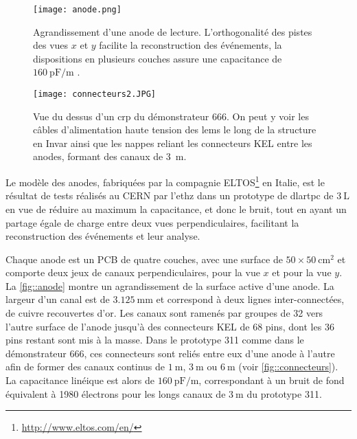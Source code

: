             \begin{figure}[htbp]
                \begin{center}\texttt{[image: anode.png]}\end{center}
                \caption[Agrandissement d'une anode de lecture.]{Agrandissement d'une anode de lecture. L'orthogonalité des pistes des vues $x$ et $y$ facilite la reconstruction des événements, la dispositions en plusieurs couches assure une capacitance de $\SI{160}{\pico\farad\per\meter}$ \cite{Cantini2013}.}
                \label{fig::anode}
            \end{figure}
            \begin{figure}[htbp]
                \begin{center}\texttt{[image: connecteurs2.JPG]}\end{center}
                \caption[Vue du dessus d'un \gls{crp} du démonstrateur 666.]{Vue du dessus d'un \gls{crp} du démonstrateur 666. On peut y voir les câbles d'alimentation haute tension des \glspl{lem} le long de la structure en Invar ainsi que les nappes reliant les connecteurs KEL entre les anodes, formant des canaux de \SI{3}{\meter}.}
                \label{fig::connecteurs}
            \end{figure}
            
            Le modèle des anodes, fabriquées par la compagnie ELTOS\footnote{\url{http://www.eltos.com/en/}} en Italie, est le résultat de tests réalisés au CERN par l'\gls{ethz} dans un prototype de \gls{dlartpc} de $\SI{3}{\liter}$ \cite{Cantini2013} en vue de réduire au maximum la capacitance, et donc le bruit, tout en ayant un partage égale de charge entre deux vues perpendiculaires, facilitant la reconstruction des événements et leur analyse.
            
            Chaque anode est un PCB de quatre couches, avec une surface de  $50\times\SI{50}{\centi\meter\squared}$ et comporte deux jeux de canaux perpendiculaires,  pour la vue $x$ et  pour la vue $y$. La \autoref{fig::anode} montre un agrandissement de la surface active d'une anode. La largeur d'un canal est de $\SI{3.125}{\milli\meter}$ et correspond à deux lignes inter-connectées, de cuivre recouvertes d'or. Les canaux sont ramenés par groupes de 32 vers l'autre surface de l'anode jusqu'à des connecteurs KEL de 68 pins, dont les 36 pins restant sont mis à la masse. Dans le prototype 311 comme dans le démonstrateur 666, ces connecteurs sont reliés entre eux d'une anode à l'autre afin de former des canaux continus de $\SI{1}{\meter}$, $\SI{3}{\meter}$ ou $\SI{6}{\meter}$ (voir  \autoref{fig::connecteurs}). La capacitance linéique est alors de $\SI{160}{\pico\farad\per\meter}$, correspondant à un bruit de fond équivalent à 1980 électrons \cite{Aimard2018} pour les longs canaux de $\SI{3}{\meter}$ du prototype 311.
            
